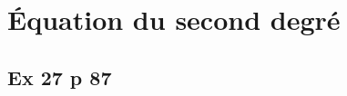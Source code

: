 \documentclass[12pt,a4paper]{book}
\begin{document}


\section*{Équation du second degré}




\subsection*{Ex 27 p 87}
\end{document}
